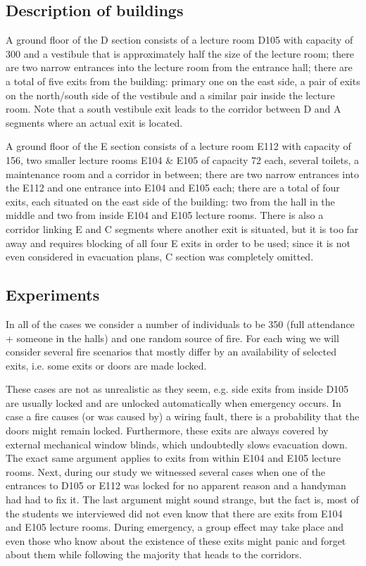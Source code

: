 \subsection{Description of buildings}
A ground floor of the D section consists of a lecture room D105 with capacity of
300 and a vestibule that is approximately half the size of the lecture room;
there are two narrow entrances into the lecture room from the entrance hall;
there are a total of five exits from the building: primary one on the east
side, a pair of exits on the north/south side of the vestibule and a similar
pair inside the lecture room.
Note that a south vestibule exit leads to the corridor between D and A segments
where an actual exit is located.

A ground floor of the E section consists of a lecture room E112 with capacity of
156, two smaller lecture rooms E104 \& E105 of capacity 72 each, several toilets,
a maintenance room and a corridor in between;
there are two narrow entrances into the E112 and one entrance into E104 and
E105 each;
there are a total of four exits, each situated on the east side of the building:
two from the hall in the middle and two from inside E104 and E105 lecture rooms.
There is also a corridor linking E and C segments where another exit is
situated, but it is too far away and requires blocking of all four E exits in
order to be used; since it is not even considered in evacuation plans, C section
was completely omitted.

\subsection{Experiments}
In all of the cases we consider a number of individuals to be 350 (full
attendance + someone in the halls) and one random source of fire. For each wing
we will consider several fire scenarios that mostly differ by an availability
of selected exits, i.e. some exits or doors are made locked.

These cases are not as unrealistic as they seem, e.g. side exits from inside
D105 are usually locked and are unlocked automatically when emergency occurs.
In case a fire causes (or was caused by) a wiring fault, there is a probability
that the doors might remain locked.
Furthermore, these exits are always covered by external mechanical window blinds,
which undoubtedly slows evacuation down.
The exact same argument applies to exits from within E104 and E105 lecture
rooms.
Next, during our study we witnessed several cases when one of the entrances
to D105 or E112 was locked for no apparent reason and a handyman had had to fix
it.
The last argument might sound strange, but the fact is, most of the students we
interviewed did not even know that there are exits from E104 and E105 lecture
rooms.
During emergency, a group effect may take place and even those who know about
the existence of these exits might panic and forget about them while following
the majority that heads to the corridors.

